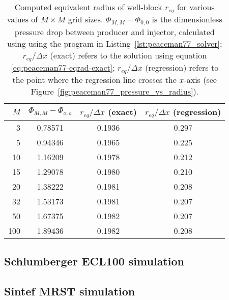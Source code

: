 \begin{table}
    \centering
    \caption{Computed equivalent radius of well-block $r_{eq}$ for various values of $M\times M$ grid sizes. $\Phi_{M,M} - \Phi_{0,0}$ is the dimensionless pressure drop between producer and injector, calculated using using the program in Listing~\ref{lst:peaceman77_solver}; $r_{eq}/\Delta x$ (exact) refers to the solution using equation \eqref{eq:peaceman77-eqrad-exact}; $r_{eq} / \Delta x$ (regression) refers to the point where the regression line crosses the $x$-axis (see Figure~\ref{fig:peaceman77_pressure_vs_radius}).}
    \begin{tabular}{rccc}
        \toprule
        $M$ & $\Phi_{M,M} - \Phi_{o,o}$ & $r_{eq}/\Delta x$ (exact) & $r_{eq} / \Delta x$ (regression)\\
        \midrule
        3   & 0.78571 & 0.1936 & 0.297 \\
        5   & 0.94346 & 0.1965 & 0.225 \\
        10  & 1.16209 & 0.1978 & 0.212 \\
        15  & 1.29078 & 0.1980 & 0.210 \\
        20  & 1.38222 & 0.1981 & 0.208 \\
        32  & 1.53173 & 0.1981 & 0.207 \\
        50  & 1.67375 & 0.1982 & 0.207 \\
        100 & 1.89436 & 0.1982 & 0.208 \\
        \bottomrule
    \end{tabular}
    \label{tbl:peaceman-results}
\end{table}






\subsection{Schlumberger ECL100 simulation} %
\label{sub:schlumberger_ecl100_simulation_results}





\subsection{Sintef MRST simulation} %
\label{sub:sintef_mrst_simulation}



